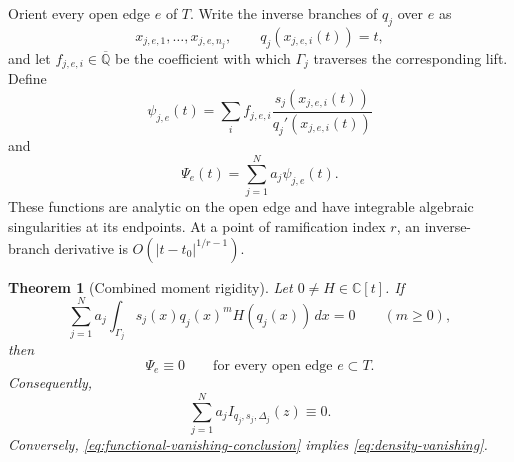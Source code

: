 \documentclass[11pt]{article}
\numberwithin{equation}{section}
\newtheorem{theorem}{Theorem}[section]
\theoremstyle{definition}
\theoremstyle{remark}
\newcommand{\C}{\mathbb C}
\newcommand{\Qbar}{\overline{\mathbb Q}}
\begin{document}
Orient every open edge $e$ of $T$.  Write the inverse branches of $q_j$
over $e$ as
\[
  x_{j,e,1},\ldots,x_{j,e,n_j},
  \qquad q_j(x_{j,e,i}(t))=t,
\]
and let $f_{j,e,i}\in\Qbar$ be the coefficient with which $\Gamma_j$
traverses the corresponding lift.  Define
\begin{equation}\label{eq:individual-density}
  \psi_{j,e}(t)
  =\sum_i f_{j,e,i}
    \frac{s_j(x_{j,e,i}(t))}{q_j'(x_{j,e,i}(t))}
\end{equation}
and
\begin{equation}\label{eq:combined-density}
  \Psi_e(t)=\sum_{j=1}^{N}a_j\psi_{j,e}(t).
\end{equation}
These functions are analytic on the open edge and have integrable algebraic
singularities at its endpoints.  At a point of ramification index $r$, an
inverse-branch derivative is $O(|t-t_0|^{1/r-1})$.

\begin{theorem}[Combined moment rigidity]
\label{thm:combined-moment-rigidity}
Let $0\ne H\in\C[t]$.  If
\begin{equation}\label{eq:combined-moments}
  \sum_{j=1}^{N}a_j
  \int_{\Gamma_j}s_j(x)q_j(x)^mH(q_j(x))\,dx=0
  \qquad(m\ge0),
\end{equation}
then
\begin{equation}\label{eq:density-vanishing}
  \Psi_e\equiv0
  \qquad\text{for every open edge }e\subset T.
\end{equation}
Consequently,
\begin{equation}\label{eq:functional-vanishing-conclusion}
  \sum_{j=1}^{N}a_jI_{q_j,s_j,\Delta_j}(z)\equiv0.
\end{equation}
Conversely, \eqref{eq:functional-vanishing-conclusion} implies
\eqref{eq:density-vanishing}.
\end{theorem}
\end{document}
